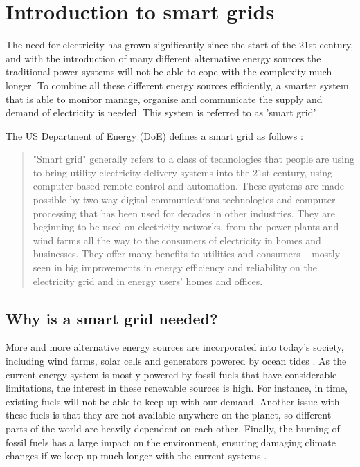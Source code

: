 \section{Introduction to smart grids}
The need for electricity has grown significantly since the start of the 21st century, and with the introduction of many different alternative energy sources the traditional power systems will not be able to cope with the complexity much longer. To combine all these different energy sources efficiently, a smarter system that is able to monitor manage, organise and communicate the supply and demand of electricity is needed. This system is referred to as 'smart grid'. 

The US Department of Energy (DoE) defines a smart grid as follows \cite{doe}:
\begin{quote}
"Smart grid" generally refers to a class of technologies that people are using to bring utility electricity delivery systems into the 21st century, using computer-based remote control and automation. These systems are made possible by two-way digital communications technologies and computer processing that has been used for decades in other industries. They are beginning to be used on electricity networks, from the power plants and wind farms all the way to the consumers of electricity in homes and businesses. They offer many benefits to utilities and consumers -- mostly seen in big improvements in energy efficiency and reliability on the electricity grid and in energy users' homes and offices.
\end{quote}

\subsection{Why is a smart grid needed?}

More and more alternative energy sources are incorporated into today's society, including wind farms, solar cells and generators powered by ocean tides \cite{Tromly2001}. As the current energy system is mostly powered by fossil fuels that have considerable limitations, the interest in these renewable sources is high. For instance, in time, existing fuels will not be able to keep up with our demand. Another issue with these fuels is that they are not available anywhere on the planet, so different parts of the world are heavily dependent on each other. Finally, the burning of fossil fuels has a large impact on the environment, ensuring damaging  climate changes if we keep up much longer with the current systems \cite{friedman2008hot}. 

